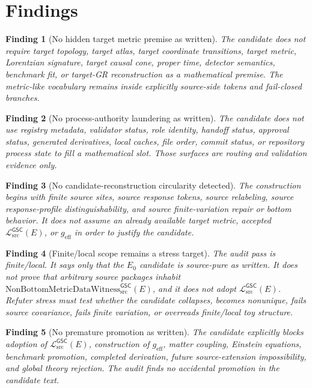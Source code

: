 \documentclass[11pt]{article}
\newcommand{\Witness}{\mathrm{NonBottomMetricDataWitness}_{\mathrm{src}}^{\mathsf{GSC}}}
\newcommand{\MetricData}{\mathcal{L}_{\mathrm{src}}^{\mathsf{GSC}}}
\newcommand{\geff}{g_{\mathrm{eff}}}
\newcommand{\Ezero}{E_{0}}
\newtheorem{finding}{Finding}
\begin{document}
\section{Findings}

\begin{finding}[No hidden target metric premise as written]
The candidate does not require target topology, target atlas, target
coordinate transitions, target metric, Lorentzian signature, target causal
cone, proper time, detector semantics, benchmark fit, or target-GR
reconstruction as a mathematical premise. The metric-like vocabulary remains
inside explicitly source-side tokens and fail-closed branches.
\end{finding}

\begin{finding}[No process-authority laundering as written]
The candidate does not use registry metadata, validator status, role identity,
handoff status, approval status, generated derivatives, local caches, file
order, commit status, or repository process state to fill a mathematical slot.
Those surfaces are routing and validation evidence only.
\end{finding}

\begin{finding}[No candidate-reconstruction circularity detected]
The construction begins with finite source sites, source response tokens,
source relabeling, source response-profile distinguishability, and source
finite-variation repair or bottom behavior. It does not assume an already
available target metric, accepted \(\MetricData(E)\), or \(\geff\) in order
to justify the candidate.
\end{finding}

\begin{finding}[Finite/local scope remains a stress target]
The audit pass is finite/local. It says only that the \(\Ezero\) candidate is
source-pure as written. It does not prove that arbitrary source packages
inhabit \(\Witness(E)\), and it does not adopt \(\MetricData(E)\). Refuter
stress must test whether the candidate collapses, becomes nonunique, fails
source covariance, fails finite variation, or overreads finite/local toy
structure.
\end{finding}

\begin{finding}[No premature promotion as written]
The candidate explicitly blocks adoption of \(\MetricData(E)\), construction
of \(\geff\), matter coupling, Einstein equations, benchmark promotion,
completed derivation, future source-extension impossibility, and global theory
rejection. The audit finds no accidental promotion in the candidate text.
\end{finding}
\end{document}
